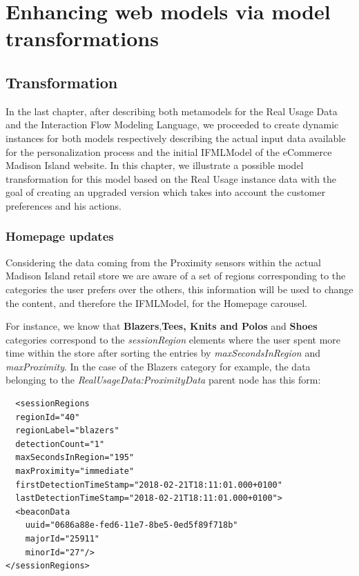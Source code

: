 \chead{}

\chapter{Enhancing web models via model transformations}
\label{enhancing-web-models-via-model-transformations}

\section{Transformation}

In the last chapter, after describing both metamodels for the Real Usage Data and the Interaction Flow Modeling Language,  we proceeded to create dynamic instances for both models respectively describing the actual input data available for the personalization process and the initial IFMLModel of the eCommerce Madison Island website. In this chapter, we illustrate a possible model transformation for this model based on the Real Usage instance data with the goal of creating an upgraded version which takes into account the customer preferences and his actions.

\subsection{Homepage updates}

Considering the data coming from the Proximity sensors within the actual Madison Island retail store we are aware of a set of regions corresponding to the categories the user prefers over the others, this information will be used to change the content, and therefore the IFMLModel, for the Homepage carousel.

For instance, we know that \textbf{Blazers},\textbf{Tees, Knits and Polos} and \textbf{Shoes} categories correspond to the \textit{sessionRegion} elements where the user spent more time within the store after sorting the entries by \textit{maxSecondsInRegion} and \textit{maxProximity}. In the case of the Blazers category for example, the data belonging to the \textit{RealUsageData:ProximityData} parent node has this form:

\vspace{0.5cm}
\lstset{language=XML}
\begin{lstlisting} 
  <sessionRegions
  regionId="40"
  regionLabel="blazers"
  detectionCount="1"
  maxSecondsInRegion="195"
  maxProximity="immediate"
  firstDetectionTimeStamp="2018-02-21T18:11:01.000+0100"
  lastDetectionTimeStamp="2018-02-21T18:11:01.000+0100">
  <beaconData
    uuid="0686a88e-fed6-11e7-8be5-0ed5f89f718b"
    majorId="25911"
    minorId="27"/>
</sessionRegions>
\end{lstlisting}
\vspace{0.5cm}

